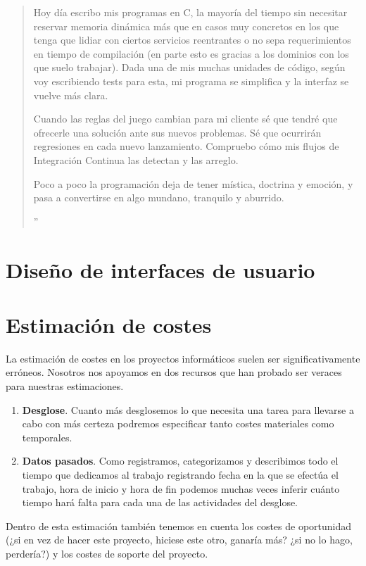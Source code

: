 \begin{quote}
{    Hoy día escribo mis programas en C, la mayoría del tiempo sin necesitar reservar
    memoria dinámica más que en casos muy concretos en los que tenga que lidiar con
    ciertos servicios reentrantes o no sepa requerimientos en tiempo de compilación
    (en parte esto es gracias a los dominios con los que suelo trabajar). Dada una
    de mis muchas unidades de código, según voy escribiendo tests para esta, mi
    programa se simplifica y la interfaz se vuelve más clara.

    Cuando las reglas del juego cambian para mi cliente sé que tendré que ofrecerle
    una solución ante sus nuevos problemas. Sé que ocurrirán regresiones en cada nuevo
    lanzamiento. Compruebo cómo mis flujos de Integración Continua las detectan y las arreglo.

    Poco a poco la programación deja de tener mística, doctrina y emoción, y pasa a
    convertirse en algo mundano, tranquilo y aburrido.%
}''
\end{quote}

\section{Diseño de interfaces de usuario}

\section{Estimación de costes}

La estimación de costes en los proyectos informáticos suelen
ser significativamente erróneos. Nosotros nos apoyamos en dos
recursos que han probado ser veraces para nuestras estimaciones.

\begin{enumerate}
    \item \textbf{Desglose}. Cuanto más desglosemos lo que
          necesita una tarea para llevarse a cabo con más
          certeza podremos especificar tanto costes materiales
          como temporales.
    \item \textbf{Datos pasados}. Como registramos, categorizamos
          y describimos todo el tiempo que dedicamos al trabajo
          registrando fecha en la que se efectúa el trabajo, hora
          de inicio y hora de fin podemos muchas veces inferir
          cuánto tiempo hará falta para cada una de las actividades
          del desglose.
\end{enumerate}

Dentro de esta estimación también tenemos en cuenta los costes de
oportunidad (¿si en vez de hacer este proyecto, hiciese este otro,
ganaría más? ¿si no lo hago, perdería?) y los costes de soporte del proyecto.

